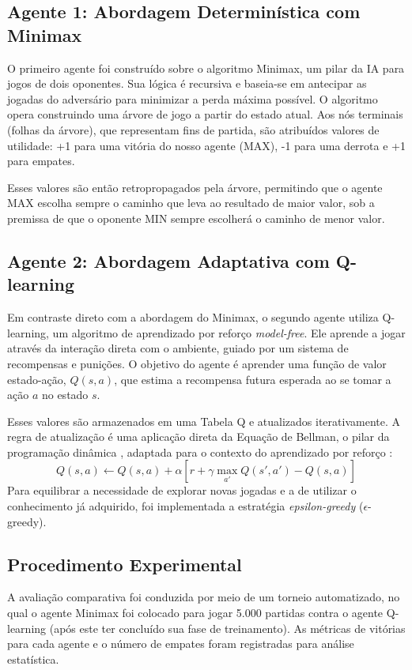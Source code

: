 \documentclass[conference]{IEEEtran}
\begin{document}
\subsection{Agente 1: Abordagem Determinística com Minimax}
O primeiro agente foi construído sobre o algoritmo Minimax, um pilar da IA para jogos de dois oponentes. Sua lógica é recursiva e baseia-se em antecipar as jogadas do adversário para minimizar a perda máxima possível. O algoritmo opera construindo uma árvore de jogo a partir do estado atual. Aos nós terminais (folhas da árvore), que representam fins de partida, são atribuídos valores de utilidade: +1 para uma vitória do nosso agente (MAX), -1 para uma derrota e +1 para empates.

Esses valores são então retropropagados pela árvore, permitindo que o agente MAX escolha sempre o caminho que leva ao resultado de maior valor, sob a premissa de que o oponente MIN sempre escolherá o caminho de menor valor.

\subsection{Agente 2: Abordagem Adaptativa com Q-learning}
Em contraste direto com a abordagem do Minimax, o segundo agente utiliza Q-learning, um algoritmo de aprendizado por reforço \textit{model-free}. Ele aprende a jogar através da interação direta com o ambiente, guiado por um sistema de recompensas e punições. O objetivo do agente é aprender uma função de valor estado-ação, $Q(s, a)$, que estima a recompensa futura esperada ao se tomar a ação $a$ no estado $s$.

Esses valores são armazenados em uma Tabela Q e atualizados iterativamente. A regra de atualização é uma aplicação direta da Equação de Bellman, o pilar da programação dinâmica \cite{bellman1957}, adaptada para o contexto do aprendizado por reforço \cite{sutton1998}:
\begin{equation}
Q(s, a) \leftarrow Q(s, a) + \alpha[r + \gamma \max_{a'} Q(s', a') - Q(s, a)]
\end{equation}
Para equilibrar a necessidade de explorar novas jogadas e a de utilizar o conhecimento já adquirido, foi implementada a estratégia \textit{epsilon-greedy} ($\epsilon$-greedy).

\subsection{Procedimento Experimental}
A avaliação comparativa foi conduzida por meio de um torneio automatizado, no qual o agente Minimax foi colocado para jogar 5.000 partidas contra o agente Q-learning (após este ter concluído sua fase de treinamento). As métricas de vitórias para cada agente e o número de empates foram registradas para análise estatística.
\end{document}
